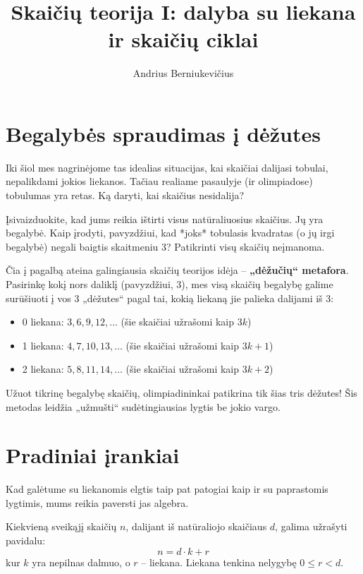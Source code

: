 \documentclass[11pt,a4paper]{scrartcl}
\title{Skaičių teorija I: dalyba su liekana ir skaičių ciklai}
\author{Andrius Berniukevičius}
\begin{document}
\maketitle

\section{Begalybės spraudimas į dėžutes}

Iki šiol mes nagrinėjome tas idealias situacijas, kai skaičiai dalijasi tobulai, nepalikdami jokios liekanos. Tačiau realiame pasaulyje (ir olimpiadose) tobulumas yra retas. Ką daryti, kai skaičius nesidalija? 

Įsivaizduokite, kad jums reikia ištirti visus natūraliuosius skaičius. Jų yra begalybė. Kaip įrodyti, pavyzdžiui, kad *joks* tobulasis kvadratas (o jų irgi begalybė) negali baigtis skaitmeniu 3? Patikrinti visų skaičių neįmanoma. 

Čia į pagalbą ateina galingiausia skaičių teorijos idėja – \textbf{„dėžučių“ metafora}. Pasirinkę kokį nors daliklį (pavyzdžiui, 3), mes visą skaičių begalybę galime surūšiuoti į vos 3 „dėžutes“ pagal tai, kokią liekaną jie palieka dalijami iš 3:
\begin{itemize}
    \item 0 liekana: \(3, 6, 9, 12, \dots\) (šie skaičiai užrašomi kaip $3k$)
    \item 1 liekana: \(4, 7, 10, 13, \dots\) (šie skaičiai užrašomi kaip \(3k+1\))
    \item 2 liekana: \(5, 8, 11, 14, \dots\) (šie skaičiai užrašomi kaip \(3k+2\))
\end{itemize}
Užuot tikrinę begalybę skaičių, olimpiadininkai patikrina tik šias tris dėžutes! Šis metodas leidžia „užmušti“ sudėtingiausias lygtis be jokio vargo.

\section{Pradiniai įrankiai}

Kad galėtume su liekanomis elgtis taip pat patogiai kaip ir su paprastomis lygtimis, mums reikia paversti jas algebra.

\begin{proposition}
Kiekvieną sveikąjį skaičių \(n\), dalijant iš natūraliojo skaičiaus \(d\), galima užrašyti pavidalu:
\begin{equation*} 
n = d \cdot k + r 
\end{equation*}
kur \(k\) yra nepilnas dalmuo, o \(r\) – liekana. 
Liekana tenkina nelygybę \(0 \le r < d\).
\end{proposition}
\end{document}
